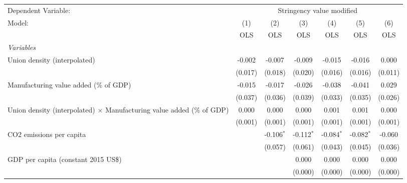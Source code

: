 
\begingroup
\centering
\begin{tabular}{lcccccc}
   \toprule
   Dependent Variable: & \multicolumn{6}{c}{Stringency value modified}\\
   Model:                                                                        & (1)     & (2)          & (3)          & (4)          & (5)          & (6)\\  
                                                                                 &  OLS    & OLS          & OLS          & OLS          & OLS          & OLS\\  
   \midrule
   \emph{Variables}\\
   Union density (interpolated)                                                  & -0.002  & -0.007       & -0.009       & -0.015       & -0.016       & 0.000\\   
                                                                                 & (0.017) & (0.018)      & (0.020)      & (0.016)      & (0.016)      & (0.011)\\   
   Manufacturing value added (\% of GDP)                                         & -0.015  & -0.017       & -0.026       & -0.038       & -0.041       & 0.029\\   
                                                                                 & (0.037) & (0.036)      & (0.039)      & (0.033)      & (0.035)      & (0.026)\\   
   Union density (interpolated) $\times$ Manufacturing value added (\% of GDP)   & 0.000   & 0.000        & 0.000        & 0.001        & 0.001        & 0.000\\   
                                                                                 & (0.001) & (0.001)      & (0.001)      & (0.001)      & (0.001)      & (0.001)\\   
   CO2 emissions per capita                                                      &         & -0.106$^{*}$ & -0.112$^{*}$ & -0.084$^{*}$ & -0.082$^{*}$ & -0.060\\   
                                                                                 &         & (0.057)      & (0.061)      & (0.043)      & (0.045)      & (0.036)\\   
   GDP per capita (constant 2015 US\$)                                           &         &              & 0.000        & 0.000        & 0.000        & 0.000\\   
                                                                                 &         &              & (0.000)      & (0.000)      & (0.000)      & (0.000)\\   

\end{tabular}
